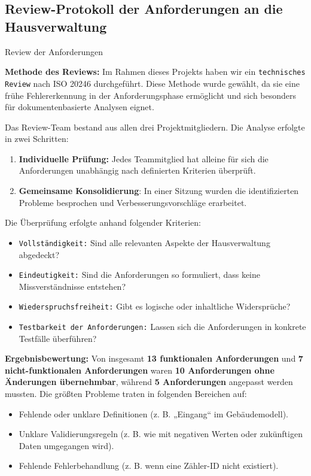 \subsection{Review-Protokoll der Anforderungen an die Hausverwaltung}

Review der Anforderungen


\textbf{Methode des Reviews:}
Im Rahmen dieses Projekts haben wir ein \texttt{technisches Review} nach ISO 20246 durchgeführt.  
Diese Methode wurde gewählt, da sie eine frühe Fehlererkennung in der Anforderungsphase ermöglicht und sich besonders für dokumentenbasierte Analysen eignet. \par

Das Review-Team bestand aus allen drei Projektmitgliedern. Die Analyse erfolgte in zwei Schritten:
\begin{enumerate}
	\item \textbf{Individuelle Prüfung:} Jedes Teammitglied hat alleine für sich die Anforderungen unabhängig nach definierten Kriterien überprüft.
	\item \textbf{Gemeinsame Konsolidierung}: In einer Sitzung wurden die identifizierten Probleme besprochen und Verbesserungsvorschläge erarbeitet.
\end{enumerate}

Die Überprüfung erfolgte anhand folgender Kriterien:
\begin{itemize}[noitemsep, topsep=0pt, parsep=0pt, partopsep=0pt]
	\item \texttt{Vollständigkeit:} Sind alle relevanten Aspekte der Hausverwaltung abgedeckt?
	\item \texttt{Eindeutigkeit:} Sind die Anforderungen so formuliert, dass keine Missverständnisse entstehen?
	\item \texttt{Wiederspruchsfreiheit:} Gibt es logische oder inhaltliche Widersprüche?
	\item \texttt{Testbarkeit der Anforderungen:} Lassen sich die Anforderungen in konkrete Testfälle überführen?
\end{itemize}
	
\textbf{Ergebnisbewertung:}  
Von insgesamt \textbf{13 funktionalen Anforderungen} und \textbf{7 nicht-funktionalen Anforderungen} waren \textbf{10 Anforderungen ohne Änderungen übernehmbar}, während \textbf{5 Anforderungen} angepasst werden mussten.  
Die größten Probleme traten in folgenden Bereichen auf:
\begin{itemize}
	\item Fehlende oder unklare Definitionen (z. B. „Eingang“ im Gebäudemodell).
	\item Unklare Validierungsregeln (z. B. wie mit negativen Werten oder zukünftigen Daten umgegangen wird).
	\item Fehlende Fehlerbehandlung (z. B. wenn eine Zähler-ID nicht existiert).
\end{itemize}

